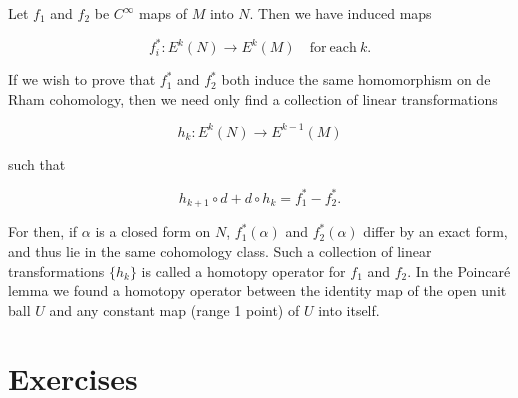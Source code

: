 \begin{remarks}\label{thm:4.19}
Let $f_{1}$ and $f_{2}$ be $C^{\infty}$ maps of $M$ into $N$. Then we have induced maps

\begin{equation}
\tag{1}\label{eq:4.19:1}
f_{i}^{*}\colon E^{k}(N)\to E^{k}(M)\quad\mathrm{for~each~}k.
\end{equation}

If we wish to prove that $f_{1}^{*}$ and $f_{2}^{*}$ both induce the same homomorphism on de Rham cohomology, then we need only find a collection of linear transformations

\begin{equation}
\tag{2}\label{eq:4.19:2}
h_{k}\colon E^{k}(N)\to E^{k-1}(M)
\end{equation}

such that

\begin{equation}
\tag{3}\label{eq:4.19:3}
h_{k+1}\circ d+d\circ h_{k}=f_{1}^{*}-f_{2}^{*}.
\end{equation}

For then, if $\alpha$ is a closed form on $N$, $f_{1}^{*}(\alpha)$ and $f_{2}^{*}(\alpha)$ differ by an exact form, and thus lie in the same cohomology class. Such a collection of linear transformations $\{h_{k}\}$ is called a homotopy operator for $f_{1}$ and $f_{2}$. In the Poincaré lemma we found a homotopy operator between the identity map of the open unit ball $U$ and any constant map (range 1 point) of $U$ into itself. 

\end{remarks}

\section{Exercises}

